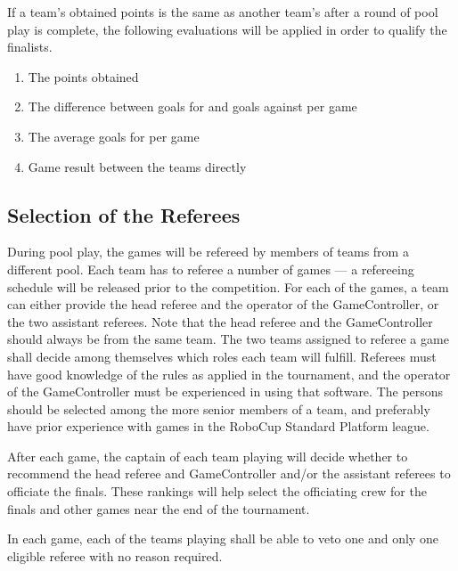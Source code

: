 \documentclass[12pt]{article}
\begin{document}
If a team's obtained points is the same as another team's after a round of pool play is complete, the following evaluations will be applied in order to qualify the finalists.

\begin{enumerate}

\item The points obtained

\item The difference between goals for and goals against per game

\item The average goals for per game

\item Game result between the teams directly

\end{enumerate}

\subsection{Selection of the Referees}
\label{sec:refSelection}
During pool play, the games will be refereed by members of teams from a different pool.  Each team has to referee a number of games --- a refereeing schedule will be released prior to the competition. For each of the games, a team can either provide the head referee and the operator of the GameController, or the two assistant referees.  Note that the head referee and the GameController should always be from the same team.  The two teams assigned to referee a game shall decide among themselves which roles each team will fulfill.  Referees must have good knowledge of the rules as applied in the tournament, and the operator of the GameController must be experienced in using that software. The persons should be selected among the more senior members of a team, and preferably have prior experience with games in the RoboCup Standard Platform league.

After each game, the captain of each team playing will decide whether to recommend the head referee and GameController and/or the assistant referees to officiate the finals.  These rankings will help select the officiating crew for the finals and other games near the end of the tournament.

In each game, each of the teams playing shall be able to veto one and only one eligible referee with no reason required.
\end{document}
